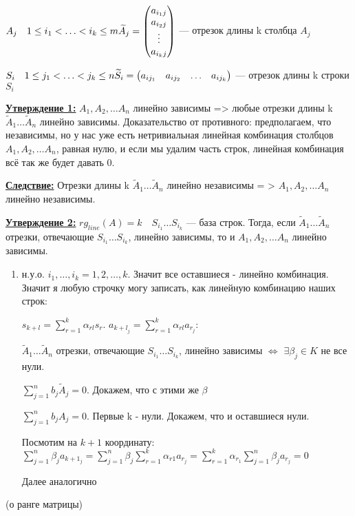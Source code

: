\( A_j \quad 1 \leq i_1 < \ldots <i_k \leq m \newline
\widetilde{A}_j =
\begin{pmatrix}
    a_{i_1j} \\
    a_{i_2j} \\
    \vdots   \\
    a_{i_kj}
\end{pmatrix}
\) --- отрезок длины k столбца $ A_j $

\( S_i \quad 1 \leq j_1 < \ldots < j_k \leq n \newline
\widetilde{S}_i =
\begin{pmatrix}
    a_{ij_1} & a_{ij_2} & \ldots & a_{ij_k}
\end{pmatrix}
\) --- отрезок длины k строки $ S_i $



\textbf{\underline{Утверждение 1:}} $ A_1, A_2, \ldots A_n $ линейно зависимы => любые отрезки длины k $ \widetilde{A}_1 \ldots \widetilde{A}_n $ линейно зависимы. \newline Доказательство от противного: предполагаем, что независимы, но у нас уже есть нетривиальная линейная комбинация столбцов $ A_1, A_2, \ldots A_n $, равная нулю, и если мы удалим часть строк, линейная комбинация всё так же будет давать 0. %

\textbf{\underline{Следствие:}} Отрезки длины k $ \widetilde{A}_1 \ldots \widetilde{A}_n $ линейно независимы = > $ A_1, A_2, \ldots A_n $ линейно независимы.

\textbf{\underline{Утверждение 2:}}
\( rg_{line}(A) = k \quad S_{i_1} \ldots S_{i_k}\) --- база строк. Тогда, если $ \widetilde{A}_1 \ldots \widetilde{A}_n $ отрезки, отвечающие $ S_{i_1} \ldots S_{i_k} $, линейно зависимы, то и $ A_1, A_2, \ldots A_n $ линейно зависимы.

\begin{enumerate}
    \item[] \prooff{}
    н.у.о. $i_1,\ldots,i_k = 1,2,\ldots, k$. Значит все оставшиеся - линейно комбинация.
    Значит я любую строчку могу записать, как линейную комбинацию наших строк:

    $s_{k+l}= \sum\limits_{r=1}^k \alpha_{rl}s_r$. $a_{{k+l}_j}=\sum\limits_{r=1}^k \alpha_{rl}a_{r_j}$:

    $ \widetilde{A}_1 \ldots \widetilde{A}_n $ отрезки, отвечающие $ S_{i_1} \ldots S_{i_k} $, линейно зависимы $\Leftrightarrow$ $\exists \beta_j \in K$ не все нули.

    $\sum\limits_{j=1}^n{b_j \widetilde{A}_j}=0$. Докажем, что с этими же $\beta$

    $\sum\limits_{j=1}^n b_j A_j = 0$. Первые k - нули. Докажем, что и оставшиеся нули.

    Посмотим на $k+1$ координату: $\sum\limits_{j=1}^n \beta_j a_{k+1_{j}} = \sum\limits_{j=1}^n \beta_j \sum\limits_{r=1}^k \alpha_{r1}a_{r_{j}} = \sum\limits_{r=1}^k \alpha_{r_1}\sum\limits_{j=1}^n \beta_j a_{r_{j}} =0$

    Далее аналогично

    
\end{enumerate}
 (о ранге матрицы)

